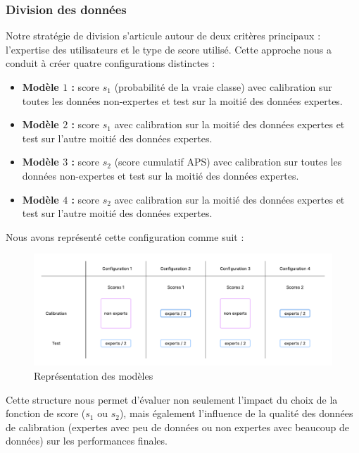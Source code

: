 \documentclass[a4paper,12pt]{article}
\begin{document}
\subsubsection{Division des données}

Notre stratégie de division s'articule autour de deux critères principaux : l'expertise des utilisateurs et le type de score utilisé. Cette approche nous a conduit à créer quatre configurations distinctes : 
\begin{itemize}
    \item \textbf{Modèle $1$ :} score $s_1$ (probabilité de la vraie classe) avec calibration sur toutes les données non-expertes et test sur la moitié des données expertes.
    \item \textbf{Modèle $2$ :} score $s_1$ avec calibration sur la moitié des données expertes et test sur l'autre moitié des données expertes.
    \item \textbf{Modèle $3$ :} score $s_2$ (score cumulatif APS) avec calibration sur toutes les données non-expertes et test sur la moitié des données expertes.
    \item \textbf{Modèle $4$ :} score $s_2$ avec calibration sur la moitié des données expertes et test sur l'autre moitié des données expertes.
\end{itemize}

\vspace{0.2cm}

Nous avons représenté cette configuration comme suit : 
\begin{figure}[H]
    \centering
    \includegraphics[scale=0.6]{images/Models.png}
    \caption{Représentation des modèles}
    \label{models}
  \end{figure}

\vspace{0.2cm}

Cette structure nous permet d'évaluer non seulement l'impact du choix de la fonction de score ($s_1$ ou $s_2$), mais également l'influence de la qualité des données de calibration (expertes avec peu de données ou non expertes avec beaucoup de données) sur les performances finales.
\end{document}
